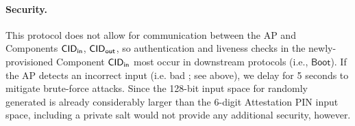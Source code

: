 \paragraph{Security.} This protocol does not allow for communication between the AP and Components $\mathsf{CID}_{\mathsf{in}}$, $\mathsf{CID}_{\mathsf{out}}$, so authentication and liveness checks in the newly-provisioned Component $\mathsf{CID}_{\mathsf{in}}$ most occur in downstream protocols (i.e., $\mathsf{Boot}$). If the AP detects an incorrect input (i.e. bad \rtok; see above), we delay for 5 seconds to mitigate brute-force attacks. \iflong Since the 128-bit input space for randomly generated \rtok is already considerably larger than the 6-digit Attestation PIN input space, including a private salt would not provide any additional security, however.\fi

